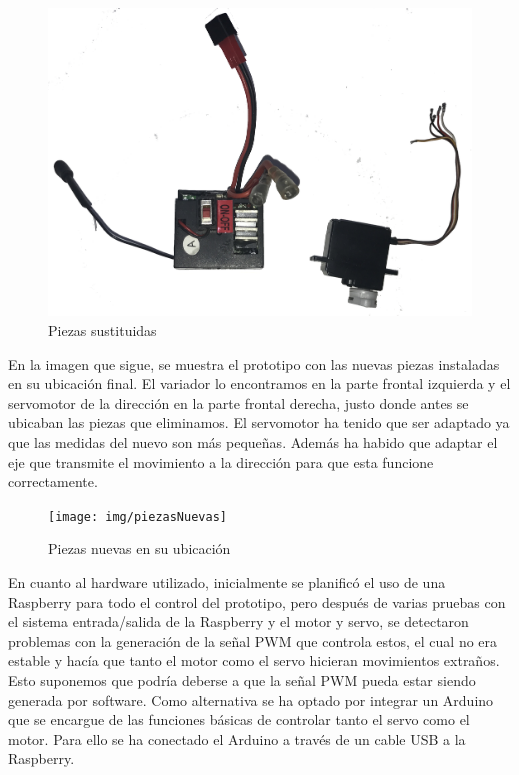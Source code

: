 \documentclass{pclass}
\begin{document}
\begin{itemize}
\begin{figure}[H]
  \centering
    \includegraphics[width=1\textwidth]{img/piezasSustituidas}
  \caption{Piezas sustituidas}
  \label{fig:PiezasSusti}
\end{figure}

En la imagen que sigue, se muestra el prototipo con las nuevas piezas instaladas en su ubicación final. El variador lo encontramos en la parte frontal izquierda y el servomotor de la dirección en la parte frontal derecha, justo donde antes se ubicaban las piezas que eliminamos. El servomotor ha tenido que ser adaptado ya que las medidas del nuevo son más pequeñas. Además ha habido que adaptar el eje que transmite el movimiento a la dirección para que esta funcione correctamente.

\begin{figure}[H]
	\centering
	\texttt{[image: img/piezasNuevas]}
	\caption{Piezas nuevas en su ubicación}
	\label{fig:PiezasNuevas}
\end{figure}

En cuanto al hardware utilizado, inicialmente se planificó el uso de una Raspberry para todo el control del prototipo, pero después de varias pruebas con el sistema entrada/salida de la Raspberry y el motor y servo, se detectaron problemas con la generación de la señal PWM que controla estos, el cual no era estable y hacía que tanto el motor como el servo hicieran movimientos extraños. Esto suponemos que podría deberse a que la señal PWM pueda estar siendo generada por software. Como alternativa se ha optado por integrar un Arduino que se encargue de las funciones básicas de controlar tanto el servo como el motor. Para ello se ha conectado el Arduino a través de un cable USB a la Raspberry.


\end{itemize}
\end{document}
